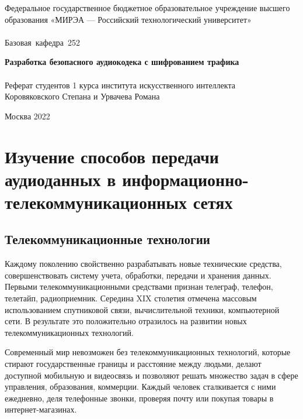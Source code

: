 \documentclass[a4paper]{report}
\begin{document}
\begin{titlepage}
\newpage



\begin{center}
\vfill

Федеральное государственное бюджетное образовательное учреждение высшего образования «МИРЭА — Российский технологический университет»\\
\ \\

\hfill\vbox
{
\hbox{Базовая кафедра 252}
}

\vfill

{\large\bf Разработка безопасного аудиокодека с шифрованием трафика\\}
\ \\
Реферат студентов 1 курса института искусственного интеллекта\\
Коровяковского Степана и Урвачева Романа

\vfill

\vfill

Москва 2022
\end{center}

\end{titlepage}
\tableofcontents
\newpage

\chapter{Изучение способов передачи аудиоданных в информационно-телекоммуникационных сетях}
\section{Телекоммуникационные технологии}
Каждому поколению свойственно разрабатывать новые технические средства, совершенствовать систему учета, обработки, передачи и хранения данных. Первыми телекоммуникационными средствами признан телеграф, телефон, телетайп, радиоприемник. Середина XIX столетия отмечена массовым использованием спутниковой связи, вычислительной техники, компьютерной сети. В результате это положительно отразилось на развитии новых телекоммуникационных технологий.
\par Современный мир невозможен без телекоммуникационных технологий, которые стирают государственные границы и расстояние между людьми, делают доступной мобильную и видеосвязь и позволяют решать множество задач в сфере управления, образования, коммерции. Каждый человек сталкивается с ними ежедневно, деля телефонные звонки, проверяя почту или покупая товары в интернет-магазинах.
\end{document}
